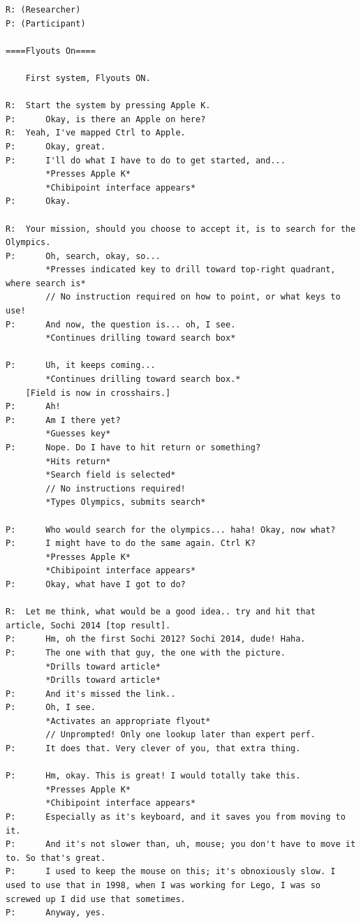 \documentclass[a4paper, 12pt]{report}
\begin{document}
\begin{lstlisting}[caption={Transcript of Usability Study}, label={lst:usabilityTrans}, style=basic, language=custom, flexiblecolumns=true]
R: (Researcher)
P: (Participant)

====Flyouts On====

	First system, Flyouts ON.

R:	Start the system by pressing Apple K.
P:		Okay, is there an Apple on here?
R:	Yeah, I've mapped Ctrl to Apple.
P:		Okay, great.
P:		I'll do what I have to do to get started, and...
		*Presses Apple K*
		*Chibipoint interface appears*
P:		Okay.

R:	Your mission, should you choose to accept it, is to search for the Olympics.
P:		Oh, search, okay, so...
		*Presses indicated key to drill toward top-right quadrant, where search is*
		// No instruction required on how to point, or what keys to use!
P:		And now, the question is... oh, I see.
		*Continues drilling toward search box*

P:		Uh, it keeps coming...
		*Continues drilling toward search box.*
	[Field is now in crosshairs.]
P:		Ah!
P:		Am I there yet?
		*Guesses key*
P:		Nope. Do I have to hit return or something?
		*Hits return*
		*Search field is selected*
		// No instructions required!
		*Types Olympics, submits search*

P:		Who would search for the olympics... haha! Okay, now what?
P:		I might have to do the same again. Ctrl K?
		*Presses Apple K*
		*Chibipoint interface appears*
P:		Okay, what have I got to do?

R:	Let me think, what would be a good idea.. try and hit that article, Sochi 2014 [top result].
P:		Hm, oh the first Sochi 2012? Sochi 2014, dude! Haha.
P:		The one with that guy, the one with the picture.
		*Drills toward article*
		*Drills toward article*
P:		And it's missed the link..
P:		Oh, I see.
		*Activates an appropriate flyout*
		// Unprompted! Only one lookup later than expert perf.
P:		It does that. Very clever of you, that extra thing.

P:		Hm, okay. This is great! I would totally take this.
		*Presses Apple K*
		*Chibipoint interface appears*
P:		Especially as it's keyboard, and it saves you from moving to it.
P:		And it's not slower than, uh, mouse; you don't have to move it to. So that's great.
P:		I used to keep the mouse on this; it's obnoxiously slow. I used to use that in 1998, when I was working for Lego, I was so screwed up I did use that sometimes.
P:		Anyway, yes.


\end{lstlisting}
\end{document}
